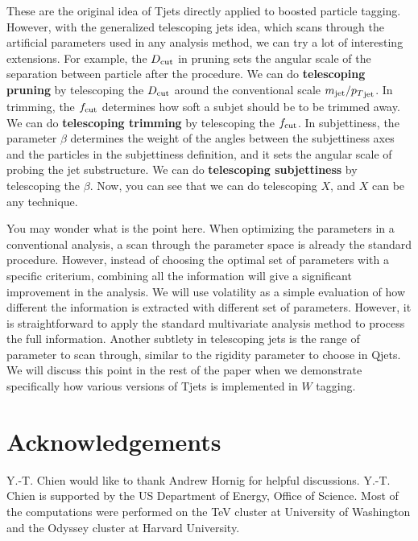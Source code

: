 \documentclass[aps,prl,floatfix,twocolumn,footinbib,amsmath,amssymb]{revtex4}
\begin{document}
These are the original idea of Tjets directly applied to boosted particle tagging. However, with the generalized telescoping jets idea, which scans through the artificial parameters used in any analysis method, we can try a lot of interesting extensions. For example, the $D_{\rm cut}$ in pruning sets the angular scale of the separation between particle after the procedure. We can do {\bf telescoping pruning} by telescoping the $D_{\rm cut}$ around the conventional scale $m_{\rm jet}/{p_T}_{\rm jet}$. In trimming, the $f_{\rm cut}$ determines how soft a subjet should be to be trimmed away. We can do {\bf telescoping trimming} by telescoping the $f_{\rm cut}$. In subjettiness, the parameter $\beta$ determines the weight of the angles between the subjettiness axes and the particles in the subjettiness definition, and it sets the angular scale of probing the jet substructure. We can do {\bf telescoping subjettiness} by telescoping the $\beta$. Now, you can see that we can do telescoping $X$, and $X$ can be any technique.

You may wonder what is the point here. When optimizing the parameters in a conventional analysis, a scan through the parameter space is already the standard procedure. However, instead of choosing the optimal set of parameters with a specific criterium, combining all the information will give a significant improvement in the analysis. We will use volatility as a simple evaluation of how different the information is extracted with different set of parameters. However, it is straightforward to apply the standard multivariate analysis method to process the full information. Another subtlety in telescoping jets is the range of parameter to scan through, similar to the rigidity parameter to choose in Qjets. We will discuss this point in the rest of the paper when we demonstrate specifically how various versions of Tjets is implemented in $W$ tagging. 



\section{Acknowledgements}
Y.-T. Chien would like to thank Andrew Hornig for helpful discussions. Y.-T. Chien is supported by the US Department of Energy, Office of Science. Most of the computations were performed on the TeV cluster at University of Washington and the Odyssey cluster at Harvard University.


\end{document}
